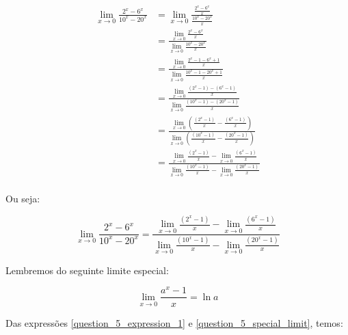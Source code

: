 \documentclass{article}
\begin{document}
\begin{align*}
    \lim_{x \to 0} \frac{2^x - 6^x}{10^x - 20^x}
     & = \lim_{x \to 0} \frac{ \frac{2^x - 6^x}{x} }{ \frac{10^x - 20^x}{x} }                                                                                           \\
     & =  \frac{ \lim_{x \to 0} \frac{2^x - 6^x}{x} }{\lim_{x \to 0} \frac{10^x - 20^x}{x} }                                                                            \\
     & =  \frac{ \lim_{x \to 0} \frac{2^x -1 - 6^x + 1}{x} }{\lim_{x \to 0} \frac{10^x -1 - 20^x +1}{x} }                                                               \\
     & =  \frac{ \lim_{x \to 0} \frac{(2^x -1) - (6^x - 1)}{x} }{\lim_{x \to 0} \frac{(10^x -1) - (20^x - 1)}{x} }                                                      \\
     & =  \frac{ \lim_{x \to 0} \left( \frac{(2^x -1)}{x} - \frac{(6^x - 1)}{x}\right) }{\lim_{x \to 0} \left(\frac{(10^x -1)}{x} - \frac{(20^x - 1)}{x}\right) }       \\
     & =  \frac{  \lim_{x \to 0} \frac{(2^x -1)}{x} -  \lim_{x \to 0} \frac{(6^x - 1)}{x} }{ \lim_{x \to 0} \frac{(10^x -1)}{x} - \lim_{x \to 0} \frac{(20^x - 1)}{x} } \\
\end{align*}

Ou seja:

\begin{equation} \label{question_5_expression_1}
    \lim_{x \to 0} \frac{2^x - 6^x}{10^x - 20^x}
    = \frac{  \lim_{x \to 0} \frac{(2^x -1)}{x} -  \lim_{x \to 0} \frac{(6^x - 1)}{x} }{ \lim_{x \to 0} \frac{(10^x -1)}{x} - \lim_{x \to 0} \frac{(20^x - 1)}{x} }
\end{equation}

Lembremos do seguinte limite especial:

\begin{equation} \label{question_5_special_limit}
    \lim_{x \to 0} \frac{a^x-1}{x} = \ln a
\end{equation}

Das expressões \ref{question_5_expression_1} e \ref{question_5_special_limit}, temos:
\end{document}
